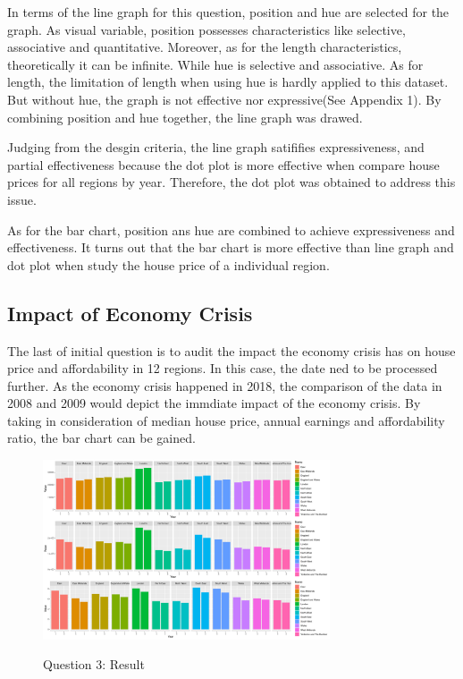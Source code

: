 \documentclass{article}
\begin{document}
In terms of the line graph for this question, position and hue are selected for the graph. As visual variable, 
position possesses characteristics like selective, associative and quantitative. Moreover, as for 
the length characteristics, theoretically it can be infinite. While hue is selective and associative. As for length, 
the limitation of length when using hue is hardly applied to this dataset. But without hue, the graph is not 
effective nor expressive(See Appendix 1). By combining position and hue together, the line graph was drawed. 

Judging from the desgin criteria, the line graph satififies expressiveness, and partial effectiveness because 
the dot plot is more effective when compare house prices for all regions by year. Therefore, the dot plot was 
obtained to address this issue.

As for the bar chart, position ans hue are combined to achieve expressiveness and effectiveness. It turns out 
that the bar chart is more effective than line graph and dot plot when study the house price of a individual region.




\subsection{Impact of Economy Crisis}
The last of initial question is to audit the impact the economy crisis has on house price and affordability
in 12 regions. In this case, the date ned to be processed further. As the economy crisis happened in 2018, 
the comparison of the data in 2008 and 2009 would depict the immdiate impact of the economy crisis. By taking 
in consideration of median house price, annual earnings and affordability ratio, the bar chart can be gained.

\begin{figure}[H]
  \begin{minipage}[b]{1.0\linewidth}
    \centering
    \centerline{\includegraphics[width=8.5cm]{Q3Geom_gridbar}}
    \centerline{Question 3: Result}\medskip
  \end{minipage}
\end{figure}
\end{document}
